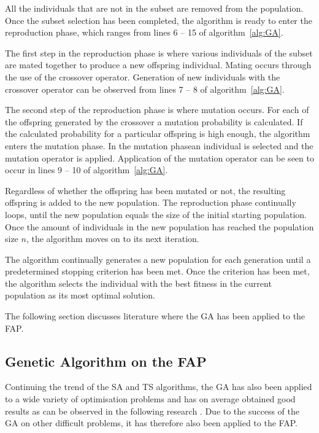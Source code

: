 All the individuals that are not in the subset are removed from the population. Once the subset selection has been completed, the algorithm is ready to enter the reproduction phase, which ranges from lines 6 -- 15 of algorithm~\ref{alg:GA}.

The first step in the reproduction phase is where various individuals of the subset are mated together to produce a new offspring individual. Mating occurs through the use of the crossover operator. Generation of new individuals with the crossover operator can be observed from lines 7 -- 8 of algorithm~\ref{alg:GA}.

The second step of the reproduction phase is where mutation occurs. For each of the offspring generated by the crossover a mutation probability is calculated. If the calculated probability for a particular offspring is high enough, the algorithm enters the mutation phase. In the mutation phasean individual is selected and the mutation operator is applied. Application of the mutation operator can be seen to occur in lines 9 -- 10 of algorithm~\ref{alg:GA}.

Regardless of whether the offspring has been mutated or not, the resulting offspring is added to the new population. The reproduction phase continually loops, until the new population equals the size of the initial starting population. Once the amount of individuals in the new population has reached the population size $n$, the algorithm moves on to its next iteration.

The algorithm continually generates a new population for each generation until a predetermined stopping criterion has been met. Once the criterion has been met, the algorithm selects the individual with the best fitness in the current population as its most optimal solution.

The following section discusses literature where the GA has been applied to the FAP.

\subsection{Genetic Algorithm on the FAP}
Continuing the trend of the SA and TS algorithms, the GA has also been applied to a wide variety of optimisation problems and has on average obtained good results as can be observed in the following research \cite{GANonConvex,SelfAdaptiveDataMiningGA,AutoComplexMeta}. Due to the success of the GA on other difficult problems, it has therefore also been applied to the FAP.

